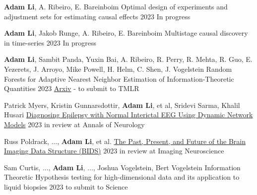 \begin{cventries}
    \cvpresentation
    {\textbf{Adam Li}, A. Ribeiro, E. Bareinboim} %
    {Optimal design of experiments and adjustment sets for estimating causal effects} %
    {2023} %
    {In progress} %
    {\empty}
    {\empty}
    \vspace{-0.9cm}

    \cvpresentation
    {\textbf{Adam Li}, Jakob Runge, A. Ribeiro, E. Bareinboim} %
    {Multistage causal discovery in time-series} %
    {2023} %
    {In progress} %
    {\empty}
    {\empty}
    \vspace{-0.9cm}
    
    \cvpresentation
    {\textbf{Adam Li}, Sambit Panda, Yuxin Bai, A. Ribeiro, R. Perry, R. Mehta, R. Guo, E. Yezerets, J. Arroyo, Mike Powell, H. Helm, C. Shen, J. Vogelstein} %
    {Random Forests for Adaptive Nearest Neighbor Estimation of Information-Theoretic Quantities} %
    {2023} %
    {\href{https://arxiv.org/abs/1907.00325}{Arxiv} - to submit to TMLR} %
    {\empty}
    {\empty}
    \vspace{-0.9cm}

    \cvpresentation
    {Patrick Myers, Kristin Gunnarsdottir, \textbf{Adam Li}, et al, Sridevi Sarma, Khalil Husari} %
    {\href{https://doi.org/10.1101/2023.08.12.23294018}{Diagnosing Epilepsy with Normal Interictal EEG Using Dynamic Network Models}} %
    {2023} %
    {in review at Annals of Neurology} %
    {\empty}
    {\empty}
    \vspace{-0.9cm}

    \cvpresentation
    {Russ Poldrack, ..., \textbf{Adam Li}, et al.} %
    {\href{https://arxiv.org/abs/2309.05768}{The Past, Present, and Future of the Brain Imaging Data Structure (BIDS)}} %
    {2023} %
    {in review at Imaging Neuroscience} %
    {\empty}
    {\empty}
    \vspace{-0.9cm}

    \cvpresentation
    {Sam Curtis, ..., \textbf{Adam Li}, ..., Joshua Vogelstein, Bert Vogelstein}
    {Information Theoretic Hypothesis testing for high-dimensional data and its application to liquid biopsies}
    {2023}
    {to submit to Science}
    {\empty}
    {\empty}
    \vspace{-0.9cm}


\end{cventries}

